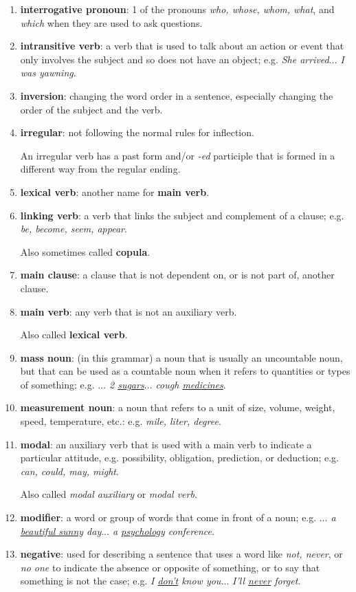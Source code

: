 \documentclass[oneside]{book}
\numberwithin{equation}{section}
\begin{document}
\begin{enumerate}
    Most questions are asked in the interrogative form.
    \item \textbf{interrogative pronoun}: 1 of the pronouns \textit{who, whose, whom, what}, and \textit{which} when they are used to ask questions.
    \item \textbf{intransitive verb}: a verb that is used to talk about an action or event that only involves the subject and so does not have an object; e.g. \textit{She arrived$\ldots$ I was yawning}.
    \item \textbf{inversion}: changing the word order in a sentence, especially changing the order of the subject and the verb.
    \item \textbf{irregular}: not following the normal rules for inflection.
    
    An irregular verb has a past form and/or \textit{-ed} participle that is formed in a different way from the regular ending.
    \item \textbf{lexical verb}: another name for \textbf{main verb}.
    \item \textbf{linking verb}: a verb that links the subject and complement of a clause; e.g. \textit{be, become, seem, appear}.
    
    Also sometimes called \textbf{copula}.
    \item \textbf{main clause}: a clause that is not dependent on, or is not part of, another clause.
    \item \textbf{main verb}: any verb that is not an auxiliary verb.
    
    Also called \textbf{lexical verb}.
    \item \textbf{mass noun}: (in this grammar) a noun that is usually an uncountable noun, but that can be used as a countable noun when it refers to quantities or types of something; e.g. \textit{$\ldots$ 2 \underline{sugars}$\ldots$ cough \underline{medicines}}.
    \item \textbf{measurement noun}: a noun that refers to a unit of size, volume, weight, speed, temperature, etc.: e.g. \textit{mile, liter, degree}.
    \item \textbf{modal}: an auxiliary verb that is used with a main verb to indicate a particular attitude, e.g. possibility, obligation, prediction, or deduction; e.g. \textit{can, could, may, might}.
    
    Also called \textit{modal auxiliary} or \textit{modal verb}.
    \item \textbf{modifier}: a word or group of words that come in front of a noun; e.g. \textit{$\ldots$ a \underline{beautiful sunny} day$\ldots$ a \underline{psychology} conference}.
    \item \textbf{negative}: used for describing a sentence that uses a word like \textit{not, never}, or \textit{no one} to indicate the absence or opposite of something, or to say that something is not the case; e.g. \textit{I \underline{don't} know you$\ldots$ I'll \underline{never} forget}.
    

\end{enumerate}
\end{document}
